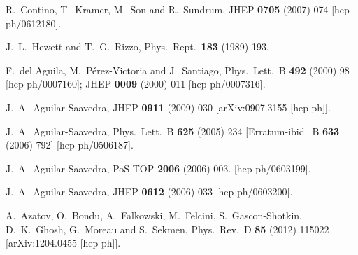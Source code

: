\documentclass[12pt,a4paper]{article}
\begin{document}
\begin{thebibliography}{99}
  R.~Contino, T.~Kramer, M.~Son and R.~Sundrum,
  JHEP {\bf 0705} (2007) 074
  [hep-ph/0612180].

  J.~L.~Hewett and T.~G.~Rizzo,
  Phys.\ Rept.\  {\bf 183} (1989) 193.

  F.~del Aguila, M.~P\'erez-Victoria and J.~Santiago,
  Phys.\ Lett.\ B {\bf 492} (2000) 98
  [hep-ph/0007160];
  JHEP {\bf 0009} (2000) 011
  [hep-ph/0007316].

  J.~A.~Aguilar-Saavedra,
  JHEP {\bf 0911} (2009) 030
  [arXiv:0907.3155 [hep-ph]].


  J.~A.~Aguilar-Saavedra,
  Phys.\ Lett.\ B {\bf 625} (2005) 234
   [Erratum-ibid.\ B {\bf 633} (2006) 792]
  [hep-ph/0506187].

  J.~A.~Aguilar-Saavedra,
  PoS TOP {\bf 2006} (2006) 003.
  [hep-ph/0603199].

 J.~A.~Aguilar-Saavedra,
 JHEP {\bf 0612} (2006) 033
 [hep-ph/0603200].

  A.~Azatov, O.~Bondu, A.~Falkowski, M.~Felcini, S.~Gascon-Shotkin, D.~K.~Ghosh, G.~Moreau and S.~Sekmen,
  Phys.\ Rev.\ D {\bf 85} (2012) 115022
  [arXiv:1204.0455 [hep-ph]].


\end{thebibliography}
\end{document}
